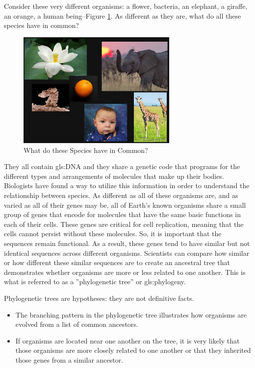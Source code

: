 \documentclass[]{article}
\begin{document}
Consider these very different organisms: a flower, bacteria, an elephant, a giraffe, an orange, a human being--Figure \ref{fig:WhatDoTheseSpeciesHaveInCommon}.
As different as they are, what do all these species have in common?
\begin{figure}[H]
	\begin{center}
		\caption{What do these Species have in Common?}\label{fig:WhatDoTheseSpeciesHaveInCommon}
		\includegraphics[width=0.7\textwidth]{WhatDoTheseSpeciesHaveInCommon}
	\end{center}
\end{figure}
They all contain \gls{gls:DNA} and they share a genetic code that programs for the different types and arrangements of molecules that make up their bodies.
Biologists have found a way to utilize this information in order to understand the relationship between species.
As different as all of these organisms are, and as varied as all of their genes may be, all of Earth's known organisms share a small group of genes that encode for molecules that have the same basic functions in each of their cells.
These genes are critical for cell replication, meaning that the cells cannot persist without these molecules.
So, it is important that the sequences remain functional.
As a result, these genes tend to have similar but not identical sequences across different organisms.
Scientists can compare how similar or how different these similar sequences are to create an ancestral tree that demonstrates whether organisms are more or less related to one another.
This is what is referred to as a ''phylogenetic tree'' or \gls{gls:phylogeny}.

Phylogenetic trees are hypotheses: they are not definitive facts.
\begin{itemize}
	\item The branching pattern	in the phylogenetic tree illustrates how organisms are evolved from a list of common ancestors.
	
	\item If organisms are located 	near one another on the tree, 	it is very likely that those organisms are more closely related to one another or that they inherited those genes from a similar ancestor.
\end{itemize}
\end{document}
